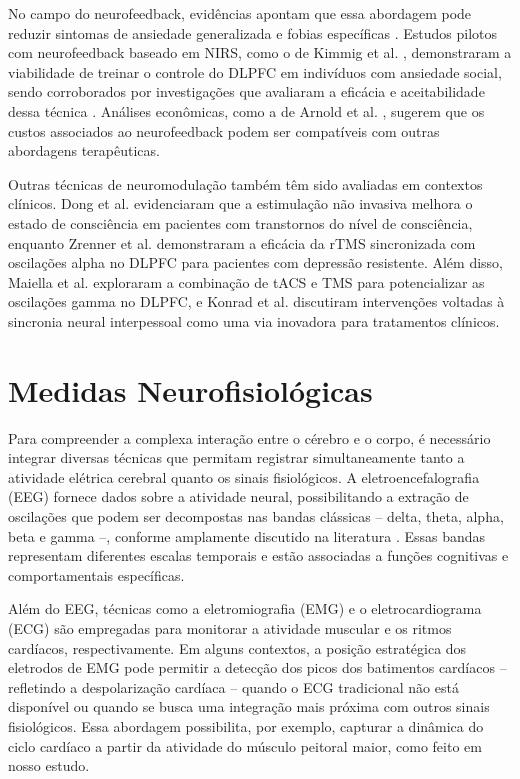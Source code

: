 No campo do neurofeedback, evidências apontam que essa abordagem pode reduzir sintomas de ansiedade generalizada e fobias específicas \cite{Hou2021, Zilverstand2015}. Estudos pilotos com neurofeedback baseado em NIRS, como o de Kimmig et al. \cite{Kimmig2019}, demonstraram a viabilidade de treinar o controle do DLPFC em indivíduos com ansiedade social, sendo corroborados por investigações que avaliaram a eficácia e aceitabilidade dessa técnica \cite{Direito2021, Steiner2014, LaMarca2018, CatalaLopez2017}. Análises econômicas, como a de Arnold et al. \cite{Arnold2013}, sugerem que os custos associados ao neurofeedback podem ser compatíveis com outras abordagens terapêuticas.

Outras técnicas de neuromodulação também têm sido avaliadas em contextos clínicos. Dong et al. \cite{dong2023efficacy} evidenciaram que a estimulação não invasiva melhora o estado de consciência em pacientes com transtornos do nível de consciência, enquanto Zrenner et al. \cite{zrenner2020brain} demonstraram a eficácia da rTMS sincronizada com oscilações alpha no DLPFC para pacientes com depressão resistente. Além disso, Maiella et al. \cite{maiella2022simultaneous} exploraram a combinação de tACS e TMS para potencializar as oscilações gamma no DLPFC, e Konrad et al. \cite{konrad2024interpersonal} discutiram intervenções voltadas à sincronia neural interpessoal como uma via inovadora para tratamentos clínicos.

\section{Medidas Neurofisiológicas}

Para compreender a complexa interação entre o cérebro e o corpo, é necessário integrar diversas técnicas que permitam registrar simultaneamente tanto a atividade elétrica cerebral quanto os sinais fisiológicos. A eletroencefalografia (EEG) fornece dados sobre a atividade neural, possibilitando a extração de oscilações que podem ser decompostas nas bandas clássicas – delta, theta, alpha, beta e gamma –, conforme amplamente discutido na literatura \cite{cohen2017where, bullmore2009complex}. Essas bandas representam diferentes escalas temporais e estão associadas a funções cognitivas e comportamentais específicas.

Além do EEG, técnicas como a eletromiografia (EMG) e o eletrocardiograma (ECG) são empregadas para monitorar a atividade muscular e os ritmos cardíacos, respectivamente. Em alguns contextos, a posição estratégica dos eletrodos de EMG pode permitir a detecção dos picos dos batimentos cardíacos – refletindo a despolarização cardíaca – quando o ECG tradicional não está disponível ou quando se busca uma integração mais próxima com outros sinais fisiológicos. Essa abordagem possibilita, por exemplo, capturar a dinâmica do ciclo cardíaco a partir da atividade do músculo peitoral maior, como feito em nosso estudo.

